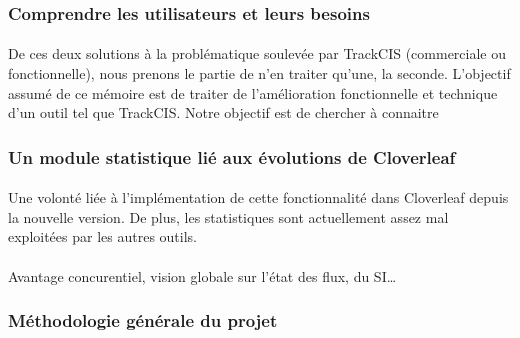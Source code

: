 		\subsubsection{Comprendre les utilisateurs et leurs besoins}
			\paragraph{}%
			De ces deux solutions à la problématique soulevée par TrackCIS (commerciale
			ou fonctionnelle), nous prenons le partie de n'en traiter qu'une, la
			seconde.\newline
			L'objectif assumé de ce mémoire est de traiter de l'amélioration
			fonctionnelle et technique d'un outil tel que TrackCIS. Notre objectif est de
			chercher à connaitre
			
			\paragraph{}%
			
			\paragraph{}%
			
		\subsubsection{Un module statistique lié aux évolutions de Cloverleaf}
			\paragraph{}%
			Une volonté liée à l'implémentation de cette fonctionnalité dans Cloverleaf depuis 
			la nouvelle version. De plus, les statistiques sont actuellement assez mal 
			exploitées par les autres outils.
			
			\paragraph{}%
			Avantage concurentiel, vision globale sur l'état des flux, du SI\ldots
			
		\subsubsection{Méthodologie générale du projet}
